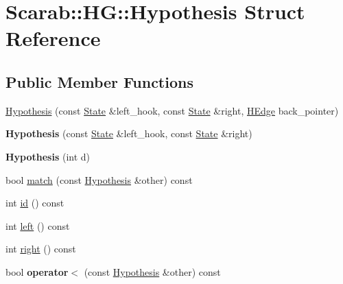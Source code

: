\hypertarget{struct_scarab_1_1_h_g_1_1_hypothesis}{
\section{Scarab::HG::Hypothesis Struct Reference}
\label{struct_scarab_1_1_h_g_1_1_hypothesis}
}
\subsection*{Public Member Functions}
\begin{DoxyCompactItemize}
\item 
\hyperlink{struct_scarab_1_1_h_g_1_1_hypothesis_aca7357ce485cb960fadb2cc62f1a888a}{Hypothesis} (const \hyperlink{struct_scarab_1_1_h_g_1_1_state}{State} \&left\_\-hook, const \hyperlink{struct_scarab_1_1_h_g_1_1_state}{State} \&right, \hyperlink{class_scarab_1_1_h_g_1_1_hyperedge}{HEdge} back\_\-pointer)
\item 
\hypertarget{struct_scarab_1_1_h_g_1_1_hypothesis_a0d71b86d0d7d3294e61671efed2722bf}{
{\bfseries Hypothesis} (const \hyperlink{struct_scarab_1_1_h_g_1_1_state}{State} \&left\_\-hook, const \hyperlink{struct_scarab_1_1_h_g_1_1_state}{State} \&right)}
\label{struct_scarab_1_1_h_g_1_1_hypothesis_a0d71b86d0d7d3294e61671efed2722bf}

\item 
\hypertarget{struct_scarab_1_1_h_g_1_1_hypothesis_a974fd973dd0c8a380f342bbd10013d6f}{
{\bfseries Hypothesis} (int d)}
\label{struct_scarab_1_1_h_g_1_1_hypothesis_a974fd973dd0c8a380f342bbd10013d6f}

\item 
bool \hyperlink{struct_scarab_1_1_h_g_1_1_hypothesis_a698008183fc3863a0c03ba0c3e5960d1}{match} (const \hyperlink{struct_scarab_1_1_h_g_1_1_hypothesis}{Hypothesis} \&other) const 
\item 
int \hyperlink{struct_scarab_1_1_h_g_1_1_hypothesis_a5a69f417c889d4d96ad5a78aa1dd2f7d}{id} () const 
\item 
int \hyperlink{struct_scarab_1_1_h_g_1_1_hypothesis_ac428cffa80bad102222f58463bfba7e5}{left} () const 
\item 
int \hyperlink{struct_scarab_1_1_h_g_1_1_hypothesis_a6c026d211fd4f4875216fc179a78e879}{right} () const 
\item 
\hypertarget{struct_scarab_1_1_h_g_1_1_hypothesis_a70597628ead54cb83fcda7422d6d2f1f}{
bool {\bfseries operator$<$} (const \hyperlink{struct_scarab_1_1_h_g_1_1_hypothesis}{Hypothesis} \&other) const }
\label{struct_scarab_1_1_h_g_1_1_hypothesis_a70597628ead54cb83fcda7422d6d2f1f}

\end{DoxyCompactItemize}
